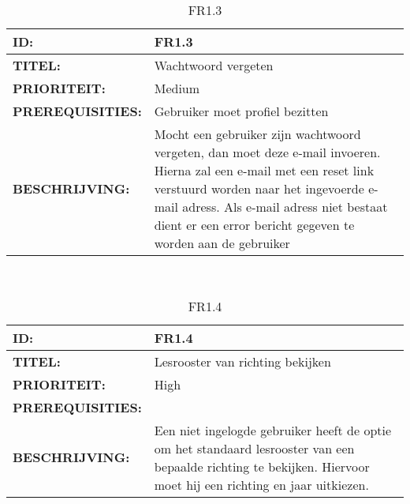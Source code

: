 
\noindent\begin{table}[h]
            \begin{tabular}{l | p{10cm}}
                \textbf{ID:} & FR1.3 \\ \hline
                \textbf{TITEL:} & Wachtwoord vergeten \\ \hline
                \textbf{PRIORITEIT:} &  Medium \\ \hline
                \textbf{PREREQUISITIES:} & Gebruiker moet profiel bezitten\\ \hline
                \textbf{BESCHRIJVING:} & Mocht een gebruiker zijn wachtwoord vergeten, dan moet deze e-mail invoeren. 
                                        Hierna zal een e-mail met een reset link verstuurd worden naar het ingevoerde e-mail adress. 
                                        Als e-mail adress niet bestaat dient er een error bericht gegeven te worden aan de gebruiker\\
            \end{tabular}\\
            \caption{FR1.3}
            \label{tab:FR1.3}
        \end{table}


\noindent\begin{table}[h]
            \begin{tabular}{l | p{10cm}}
                \textbf{ID:} & FR1.4 \\ \hline
                \textbf{TITEL:} & Lesrooster van richting bekijken \\ \hline
                \textbf{PRIORITEIT:} &  High \\ \hline
                \textbf{PREREQUISITIES:} & \\ \hline
                \textbf{BESCHRIJVING:} & Een niet ingelogde gebruiker heeft de optie om het standaard lesrooster van een bepaalde richting te bekijken. 
                                        Hiervoor moet hij een richting en jaar uitkiezen.\\
            \end{tabular}\\
            \caption{FR1.4}
            \label{tab:FR1.4}
        \end{table}


